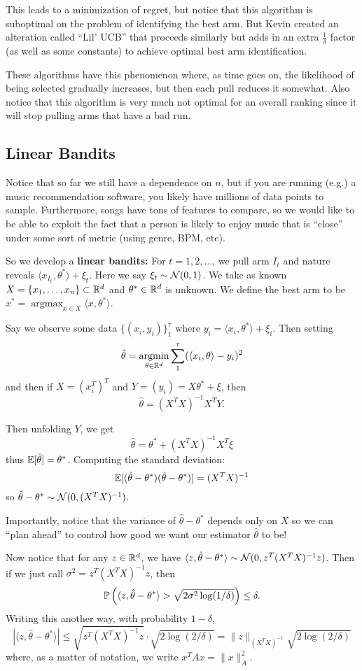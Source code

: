 \documentclass[12pt]{article}
\DeclareMathOperator*{\argmin}{argmin}
\DeclareMathOperator*{\argmax}{argmax}
\begin{document}
This leads to a minimization of regret, but notice that this algorithm is suboptimal on the problem of identifying the best arm. But Kevin 
created an alteration called ``Lil' UCB'' that proceeds similarly but adds in an extra $\frac{1}{\delta}$ factor (as well as some constants) to achieve optimal best arm identification.

These algorithms have this phenomenon where, as time goes on, the likelihood of being selected gradually increases, but then each pull reduces it somewhat. Also notice that this algorithm 
is very much not optimal for an overall ranking since it will stop pulling arms that have a bad run. 

\subsection{Linear Bandits}
Notice that so far we still have a dependence on $n$, but if you are running (e.g.) a music recommendation software, you likely have millions of data points to sample.
Furthermore, songs have tons of features to compare, so we would like to be able to exploit the fact that a person is likely to enjoy music that is ``close'' under some sort of metric (using genre, BPM, etc).

So we develop a \textbf{linear bandits:} For $t=1,2,\dots$, we pull arm $I_t$ and nature reveals $\langle x_{I_t},\theta^\ast\rangle+\xi_t$. 
Here we say $\xi_t\sim\mathcal{N}(0,1)$. We take as known $X=\{x_1,\dots,x_n\}\subset \mathbb{R}^d$ and $\theta^\ast\in\mathbb{R}^d$ is unknown.
We define the best arm to be $x^\ast=\argmax_{x\in X}\langle x,\theta^\ast\rangle$.

Say we observe some data $\{(x_i,y_i)\}_1^\tau$ where $y_i=\langle x_i,\theta^\ast\rangle+\xi_i$. Then setting 
\[\hat\theta=\argmin_{\theta\in\bbR^d}\sum_1^\tau(\langle x_i,\theta\rangle-y_i)^2\]
and then if $X=(x_i^T)^T$ and $Y=(y_i)=X\theta^\ast+\xi$, then 
\[\hat\theta=(X^TX)^{-1}X^TY.\]

Then unfolding $Y$, we get 
\[\hat\theta=\theta^\ast+(X^TX)^{-1}X^T\xi\]
thus $\mathbb{E}[\hat\theta]=\theta^\ast$. Computing the standard deviation:
\[\mathbb{E}[(\hat\theta-\theta^\ast)(\hat\theta-\theta^\ast)]=(X^TX)^{-1}\]
so $\hat\theta-\theta^\ast\sim\mathcal{N}(0,(X^TX)^{-1})$.

Importantly, notice that the variance of $\hat\theta-\theta^\ast$ depends only on $X$ so we can ``plan ahead'' to control how good we want our estimator $\hat\theta$ to be!

Now notice that for any $z\in\mathbb{R}^d$, we have $\langle z,\hat\theta-\theta^\ast\rangle\sim\mathcal{N}(0,z^T(X^TX)^{-1}z)$. Then if we just call $\sigma^2=z^T(X^TX)^{-1}z$, then 
\[\mathbb{P}\left(\langle z,\hat\theta-\theta^\ast\rangle>\sqrt{2\sigma^2\log(1/\delta)}\right)\le\delta.\]
Writing this another way, with probability $1-\delta,$
\[|\langle z,\hat\theta-\theta^\ast\rangle|\le\sqrt{z^T(X^TX)^{-1}z}\cdot\sqrt{2\log(2/\delta)}=\|z\|_{(X^TX)^{-1}}\sqrt{2\log(2/\delta)}\]
where, as a matter of notation, we write $x^TAx=\|x\|_A^2$.
\end{document}
